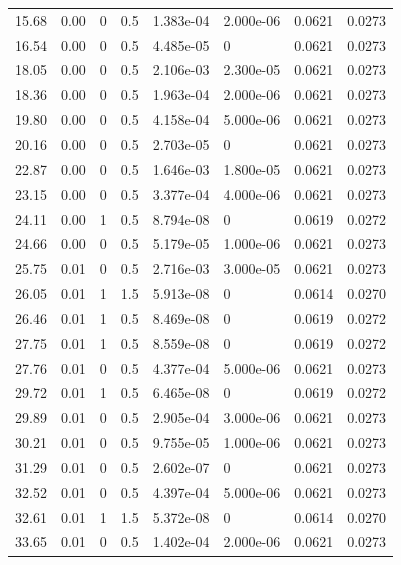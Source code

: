\documentclass[preview]{standalone}
\begin{document}
{{\begin{tabular}{L{1.2cm}C{1.2cm} C{0.3cm}C{0.5cm} C{1.4cm}C{1.4cm} C{1.4cm}C{1.4cm}}
  15.68  &  0.00  & 0     & 0.5 &  1.383e-04  & 2.000e-06  & 0.0621 &  0.0273   \\ 
  16.54  &  0.00  & 0     & 0.5 &  4.485e-05  & 0  & 0.0621 &  0.0273   \\ 
  18.05  &  0.00  & 0     & 0.5 &  2.106e-03  & 2.300e-05  & 0.0621 &  0.0273   \\ 
  18.36  &  0.00  & 0     & 0.5 &  1.963e-04  & 2.000e-06  & 0.0621 &  0.0273   \\ 
  19.80  &  0.00  & 0     & 0.5 &  4.158e-04  & 5.000e-06  & 0.0621 &  0.0273   \\ 
  20.16  &  0.00  & 0     & 0.5 &  2.703e-05  & 0  & 0.0621 &  0.0273   \\ 
  22.87  &  0.00  & 0     & 0.5 &  1.646e-03  & 1.800e-05  & 0.0621 &  0.0273   \\ 
  23.15  &  0.00  & 0     & 0.5 &  3.377e-04  & 4.000e-06  & 0.0621 &  0.0273   \\ 
  24.11  &  0.00  & 1     & 0.5 &  8.794e-08  & 0  & 0.0619 &  0.0272   \\ 
  24.66  &  0.00  & 0     & 0.5 &  5.179e-05  & 1.000e-06  & 0.0621 &  0.0273   \\ 
  25.75  &  0.01  & 0     & 0.5 &  2.716e-03  & 3.000e-05  & 0.0621 &  0.0273   \\ 
  26.05  &  0.01  & 1     & 1.5 &  5.913e-08  & 0  & 0.0614 &  0.0270   \\ 
  26.46  &  0.01  & 1     & 0.5 &  8.469e-08  & 0  & 0.0619 &  0.0272   \\ 
  27.75  &  0.01  & 1     & 0.5 &  8.559e-08  & 0  & 0.0619 &  0.0272   \\ 
  27.76  &  0.01  & 0     & 0.5 &  4.377e-04  & 5.000e-06  & 0.0621 &  0.0273   \\ 
  29.72  &  0.01  & 1     & 0.5 &  6.465e-08  & 0  & 0.0619 &  0.0272   \\ 
  29.89  &  0.01  & 0     & 0.5 &  2.905e-04  & 3.000e-06  & 0.0621 &  0.0273   \\ 
  30.21  &  0.01  & 0     & 0.5 &  9.755e-05  & 1.000e-06  & 0.0621 &  0.0273   \\ 
  31.29  &  0.01  & 0     & 0.5 &  2.602e-07  & 0  & 0.0621 &  0.0273   \\ 
  32.52  &  0.01  & 0     & 0.5 &  4.397e-04  & 5.000e-06  & 0.0621 &  0.0273   \\ 
  32.61  &  0.01  & 1     & 1.5 &  5.372e-08  & 0  & 0.0614 &  0.0270   \\ 
  33.65  &  0.01  & 0     & 0.5 &  1.402e-04  & 2.000e-06  & 0.0621 &  0.0273   \\ 

\end{tabular}}}
\end{document}
